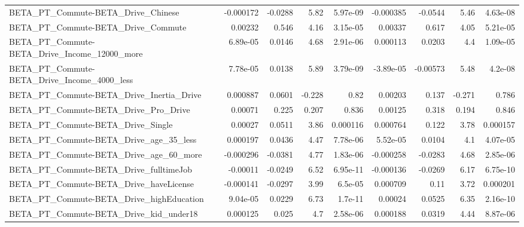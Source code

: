 \begin{tabular}{lrrrrrrrr}
BETA\_PT\_Commute-BETA\_Drive\_Chinese                 &   -0.000172 &      -0.0288 &     5.82 & 5.97e-09 &  -0.000385 &     -0.0544 &         5.46 &      4.63e-08 \\
BETA\_PT\_Commute-BETA\_Drive\_Commute                 &     0.00232 &        0.546 &     4.16 & 3.15e-05 &    0.00337 &       0.617 &         4.05 &      5.21e-05 \\
BETA\_PT\_Commute-BETA\_Drive\_Income\_12000\_more       &    6.89e-05 &       0.0146 &     4.68 & 2.91e-06 &   0.000113 &      0.0203 &          4.4 &      1.09e-05 \\
BETA\_PT\_Commute-BETA\_Drive\_Income\_4000\_less        &    7.78e-05 &       0.0138 &     5.89 & 3.79e-09 &  -3.89e-05 &    -0.00573 &         5.48 &       4.2e-08 \\
BETA\_PT\_Commute-BETA\_Drive\_Inertia\_Drive           &    0.000887 &       0.0601 &   -0.228 &     0.82 &    0.00203 &       0.137 &       -0.271 &         0.786 \\
BETA\_PT\_Commute-BETA\_Drive\_Pro\_Drive               &     0.00071 &        0.225 &    0.207 &    0.836 &    0.00125 &       0.318 &        0.194 &         0.846 \\
BETA\_PT\_Commute-BETA\_Drive\_Single                  &     0.00027 &       0.0511 &     3.86 & 0.000116 &   0.000764 &       0.122 &         3.78 &      0.000157 \\
BETA\_PT\_Commute-BETA\_Drive\_age\_35\_less             &    0.000197 &       0.0436 &     4.47 & 7.78e-06 &   5.52e-05 &      0.0104 &          4.1 &      4.07e-05 \\
BETA\_PT\_Commute-BETA\_Drive\_age\_60\_more             &   -0.000296 &      -0.0381 &     4.77 & 1.83e-06 &  -0.000258 &     -0.0283 &         4.68 &      2.85e-06 \\
BETA\_PT\_Commute-BETA\_Drive\_fulltimeJob             &    -0.00011 &      -0.0249 &     6.52 & 6.95e-11 &  -0.000136 &     -0.0269 &         6.17 &      6.75e-10 \\
BETA\_PT\_Commute-BETA\_Drive\_haveLicense             &   -0.000141 &      -0.0297 &     3.99 &  6.5e-05 &   0.000709 &        0.11 &         3.72 &      0.000201 \\
BETA\_PT\_Commute-BETA\_Drive\_highEducation           &    9.04e-05 &       0.0229 &     6.73 &  1.7e-11 &    0.00024 &      0.0525 &         6.35 &      2.16e-10 \\
BETA\_PT\_Commute-BETA\_Drive\_kid\_under18             &    0.000125 &        0.025 &      4.7 & 2.58e-06 &   0.000188 &      0.0319 &         4.44 &      8.87e-06 \\

\end{tabular}

